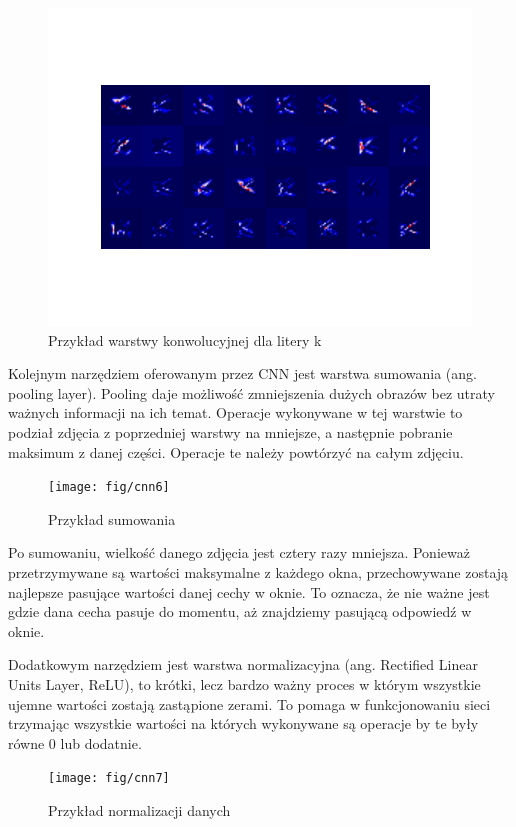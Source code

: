 \documentclass[brudnopis]{xmgr}
\begin{document}
\begin{figure}[!tbh]
\centering
\includegraphics[width=.8\hsize]{fig/figure_1}
\caption{Przykład warstwy konwolucyjnej dla litery k}
\end{figure}
\newpage

Kolejnym narzędziem oferowanym przez CNN jest warstwa sumowania (ang. pooling layer). Pooling daje możliwość zmniejszenia dużych obrazów bez utraty ważnych informacji na ich temat. Operacje wykonywane w tej warstwie to podział zdjęcia z poprzedniej warstwy na mniejsze, a następnie pobranie maksimum z danej części. Operacje te należy powtórzyć na całym zdjęciu.


\begin{figure}[!tbh]
\centering
\texttt{[image: fig/cnn6]}
\caption{Przykład sumowania}
\end{figure}

Po sumowaniu, wielkość danego zdjęcia jest cztery razy mniejsza. Ponieważ przetrzymywane są wartości maksymalne z każdego okna, przechowywane zostają najlepsze pasujące wartości danej cechy w oknie. To oznacza, że nie ważne jest gdzie dana cecha pasuje do momentu, aż znajdziemy pasującą odpowiedź w oknie.

Dodatkowym narzędziem jest warstwa normalizacyjna (ang. Rectified Linear Units Layer, ReLU), to krótki, lecz bardzo ważny proces w którym wszystkie ujemne wartości zostają zastąpione zerami. To pomaga w funkcjonowaniu sieci trzymając wszystkie wartości na których wykonywane są operacje by te były równe 0 lub dodatnie.

\begin{figure}[!tbh]
\centering
\texttt{[image: fig/cnn7]}
\caption{Przykład normalizacji danych}
\end{figure}
\newpage
\end{document}
